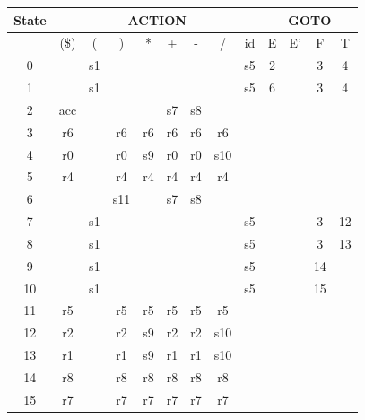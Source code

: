 \documentclass{article}
\author{Michael Movsesyan}
\begin{document}
\maketitle

\begin{tabular}{|c|c|c|c|c|c|c|c|c|c|c|c|c|}
\hline
State & \multicolumn{8}{|c|}{ACTION} & \multicolumn{4}{|c|}{GOTO} \\
\hline
 &  (\$) & ( & ) & * & + & - & / & id & E & E' & F & T \\
\hline
0 &  & s1 &  &  &  &  &  & s5 & 2 &  & 3 & 4 \\ \hline
1 &  & s1 &  &  &  &  &  & s5 & 6 &  & 3 & 4 \\ \hline
2 & acc &  &  &  & s7 & s8 &  &  &  &  &  &  \\ \hline
3 & r6 &  & r6 & r6 & r6 & r6 & r6 &  &  &  &  &  \\ \hline
4 & r0 &  & r0 & s9 & r0 & r0 & s10 &  &  &  &  &  \\ \hline
5 & r4 &  & r4 & r4 & r4 & r4 & r4 &  &  &  &  &  \\ \hline
6 &  &  & s11 &  & s7 & s8 &  &  &  &  &  &  \\ \hline
7 &  & s1 &  &  &  &  &  & s5 &  &  & 3 & 12 \\ \hline
8 &  & s1 &  &  &  &  &  & s5 &  &  & 3 & 13 \\ \hline
9 &  & s1 &  &  &  &  &  & s5 &  &  & 14 &  \\ \hline
10 &  & s1 &  &  &  &  &  & s5 &  &  & 15 &  \\ \hline
11 & r5 &  & r5 & r5 & r5 & r5 & r5 &  &  &  &  &  \\ \hline
12 & r2 &  & r2 & s9 & r2 & r2 & s10 &  &  &  &  &  \\ \hline
13 & r1 &  & r1 & s9 & r1 & r1 & s10 &  &  &  &  &  \\ \hline
14 & r8 &  & r8 & r8 & r8 & r8 & r8 &  &  &  &  &  \\ \hline
15 & r7 &  & r7 & r7 & r7 & r7 & r7 &  &  &  &  &  \\ \hline
\end{tabular}
\end{document}
